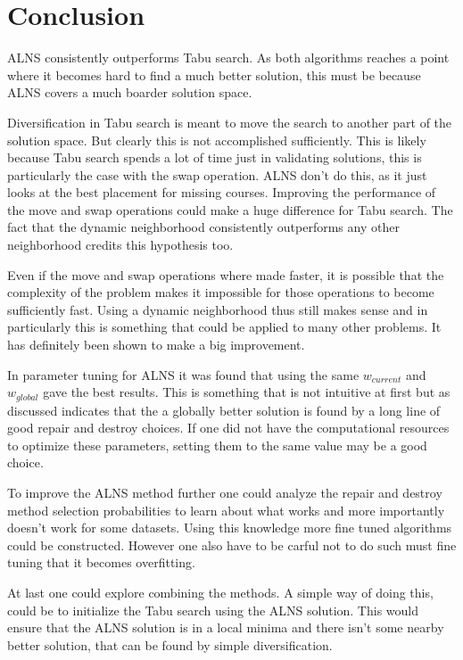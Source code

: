 \section{Conclusion}

ALNS consistently outperforms Tabu search. As both algorithms reaches a point where it becomes hard to find a much better solution, this must be because ALNS covers a much boarder solution space.

Diversification in Tabu search is meant to move the search to another part of the solution space. But clearly this is not accomplished sufficiently. This is likely because Tabu search spends a lot of time just in validating solutions, this is particularly the case with the swap operation. ALNS don't do this, as it just looks at the best placement for missing courses. Improving the performance of the move and swap operations could make a huge difference for Tabu search. The fact that the dynamic neighborhood consistently outperforms any other neighborhood credits this hypothesis too.

Even if the move and swap operations where made faster, it is possible that the complexity of the problem makes it impossible for those operations to become sufficiently fast. Using a dynamic neighborhood thus still makes sense and in particularly this is something that could be applied to many other problems. It has definitely been shown to make a big improvement.

In parameter tuning for ALNS it was found that using the same $w_{current}$ and $w_{global}$ gave the best results. This is something that is not intuitive at first but as discussed indicates that the a globally better solution is found by a long line of good repair and destroy choices. If one did not have the computational resources to optimize these parameters, setting them to the same value may be a good choice.

To improve the ALNS method further one could analyze the repair and destroy method selection probabilities to learn about what works and more importantly doesn't work for some datasets. Using this knowledge more fine tuned algorithms could be constructed. However one also have to be carful not to do such must fine tuning that it becomes overfitting.

At last one could explore combining the methods. A simple way of doing this, could be to initialize the Tabu search using the ALNS solution. This would ensure that the ALNS solution is in a local minima and there isn't some nearby better solution, that can be found by simple diversification.
